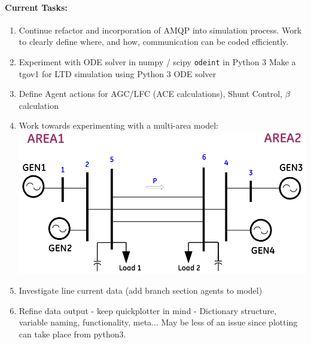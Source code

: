 \documentclass[12pt]{article}
\begin{document}
\paragraph{Current Tasks:}
	\begin{enumerate}
		\item Continue refactor and incorporation of AMQP into simulation process.
			\subitem Work to clearly define where, and how, communication can be coded efficiently.
		\item Experiment with ODE solver in numpy / scipy \verb|odeint| in Python 3
			\subitem Make a tgov1 for LTD simulation using Python 3 ODE solver

		\item Define Agent actions for AGC/LFC (ACE calculations), Shunt Control, $\beta$ calculation

		\item Work towards experimenting with a multi-area model:\\
		\includegraphics[width=.5\linewidth]{g4aSys}
		\item Investigate line current data (add branch section agents to model)
		
		\item Refine data output - keep quickplotter in mind - Dictionary structure, variable naming, functionality, meta... May be less of an issue since plotting can take place from python3.
	\end{enumerate}
\pagebreak
\end{document}
